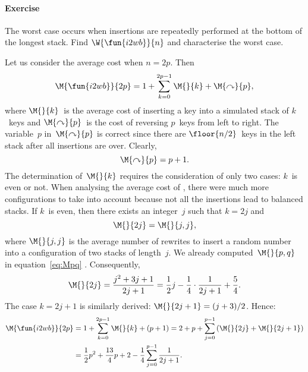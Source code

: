 \paragraph{Exercise}

The worst case occurs when insertions are repeatedly performed at the
bottom of the longest stack. Find \(\W{\fun{i2wb}}{n}\) and
characterise the worst case.


Let us consider the average cost when \(n=2p\). Then
\begin{equation*}
\M{\fun{i2wb}}{2p} =
  1 + \sum_{k=0}^{2p-1}{\M{}{k}} + \M{\curvearrowright}{p},
\end{equation*}
where \(\M{}{k}\)~is the average cost of inserting a key into a
simulated stack of \(k\)~keys and
\(\M{\curvearrowright}{p}\)~is
the cost of reversing \(p\)~keys from left to right. The variable~\(p\)
in~\(\M{\curvearrowright}{p}\) is correct since there are
\(\floor{n/2}\)~keys in the left stack after all insertions are
over. Clearly,
\begin{equation*}
\M{\curvearrowright}{p} = p + 1.
\end{equation*}
The determination of~\(\M{}{k}\) requires the consideration of only
two cases: \(k\)~is even or not. When analysing the average cost of
, there were much more configurations to take into account
because not all the insertions lead to balanced stacks. If \(k\)~is
even, then there exists an integer~\(j\) such that \(k=2j\) and
\begin{equation*}
\M{}{2j} = \M{}{j,j},
\end{equation*}
where \(\M{}{j,j}\) is the average number of rewrites to insert a
random number into a configuration of two stacks of length~\(j\). We
already computed~\(\M{}{p,q}\) in equation~\eqref{eq:Mpq}
. Consequently,
\begin{equation*}
\M{}{2j} = \frac{j^2 + 3j + 1}{2j+1}
         = \frac{1}{2}{j} - \frac{1}{4} \cdot \frac{1}{2j+1} +
         \frac{5}{4}.
\end{equation*}
The case \(k=2j+1\) is similarly derived: \(\M{}{2j+1} =
(j+3)/2\). Hence:
\begin{align}
\M{\fun{i2wb}}{2p}
  &= 1 + \sum_{k=0}^{2p-1}{\M{}{k}} + (p+1)
   = 2 + p + \sum_{j=0}^{p-1}{(\M{}{2j} + \M{}{2j+1})}\notag\\
  &= \frac{1}{2}{p^2} + \frac{13}{4}{p} + 2 -
             \frac{1}{4}\sum_{j=0}^{p-1}{\frac{1}{2j+1}}.
\label{eq:i2wb_2p}
\end{align}
